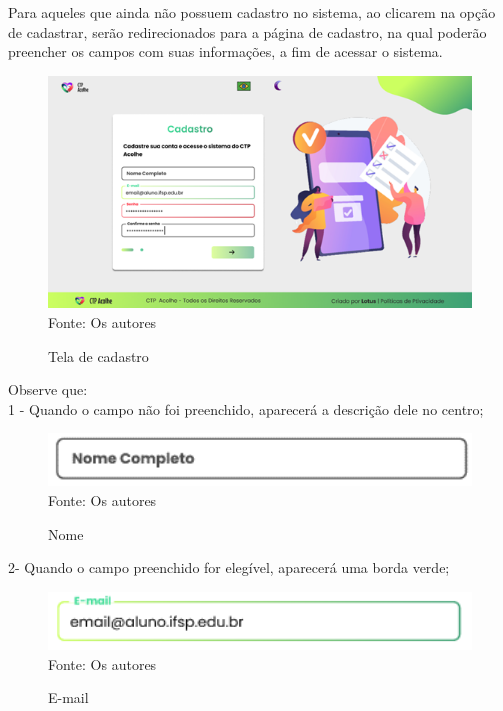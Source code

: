 \documentclass[12pt,a4paper]{article}
\begin{document}
\begin{itemize}
    Para aqueles que ainda não possuem cadastro no sistema, ao clicarem na opção de cadastrar, serão redirecionados para a página de cadastro, na qual poderão preencher os campos com suas informações, a fim de acessar o sistema.
            \begin{figure}[H]
                        \centering
                        \caption{Tela de cadastro}
                        \includegraphics[width=15cm]{prot11.png}
                        Fonte: Os autores
                    \end{figure}  
        Observe que: \\
        1 - Quando o campo não foi preenchido, aparecerá a descrição dele no centro; 
             \begin{figure}[H]
                            \centering
                            \caption{Nome}
                            \includegraphics[width=15cm]{prot12.png}
                            Fonte: Os autores
                        \end{figure} 
        2- Quando o campo preenchido for elegível, aparecerá uma borda verde; 
                \begin{figure}[H]
                                \centering
                                \caption{E-mail}
                                \includegraphics[width=15cm]{prot13.png}
                                Fonte: Os autores
                            \end{figure} 

\end{itemize}
\end{document}

